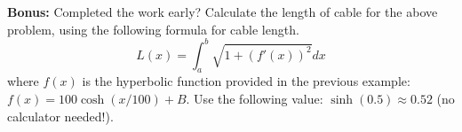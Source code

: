 \documentclass[11pt]{article}
\begin{document}
	\vspace{9 cm}
	\textbf{Bonus:} Completed the work early? Calculate the length of cable for the above problem, using the following formula for
cable length.
\[L(x)=\int_a^b \sqrt{1+(f'(x))^2} dx\]
where $f(x)$ is the hyperbolic function provided in the previous example:
$f(x) = 100 \cosh(x/100) + B.$ Use the following
value: $\sinh(0.5)\approx 0.52$ (no calculator needed!).
\end{document}
